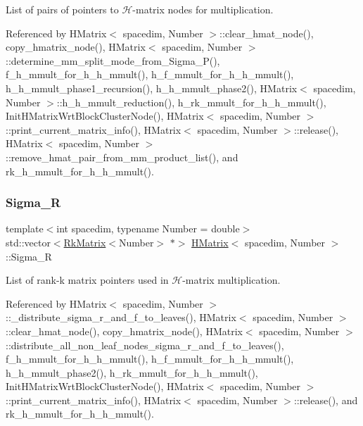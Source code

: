 List of pairs of pointers to $\mathcal{H}$-\/matrix nodes for multiplication. 

Referenced by H\+Matrix$<$ spacedim, Number $>$\+::clear\+\_\+hmat\+\_\+node(), copy\+\_\+hmatrix\+\_\+node(), H\+Matrix$<$ spacedim, Number $>$\+::determine\+\_\+mm\+\_\+split\+\_\+mode\+\_\+from\+\_\+\+Sigma\+\_\+\+P(), f\+\_\+h\+\_\+mmult\+\_\+for\+\_\+h\+\_\+h\+\_\+mmult(), h\+\_\+f\+\_\+mmult\+\_\+for\+\_\+h\+\_\+h\+\_\+mmult(), h\+\_\+h\+\_\+mmult\+\_\+phase1\+\_\+recursion(), h\+\_\+h\+\_\+mmult\+\_\+phase2(), H\+Matrix$<$ spacedim, Number $>$\+::h\+\_\+h\+\_\+mmult\+\_\+reduction(), h\+\_\+rk\+\_\+mmult\+\_\+for\+\_\+h\+\_\+h\+\_\+mmult(), Init\+H\+Matrix\+Wrt\+Block\+Cluster\+Node(), H\+Matrix$<$ spacedim, Number $>$\+::print\+\_\+current\+\_\+matrix\+\_\+info(), H\+Matrix$<$ spacedim, Number $>$\+::release(), H\+Matrix$<$ spacedim, Number $>$\+::remove\+\_\+hmat\+\_\+pair\+\_\+from\+\_\+mm\+\_\+product\+\_\+list(), and rk\+\_\+h\+\_\+mmult\+\_\+for\+\_\+h\+\_\+h\+\_\+mmult().

\mbox{\label{classHMatrix_a04d341b4e606d1be2d71b8ea636efe7b}} 
\subsubsection{\texorpdfstring{Sigma\+\_\+R}{Sigma\_R}}
{\footnotesize\ttfamily template$<$int spacedim, typename Number = double$>$ \\
std\+::vector$<$\hyperlink{classRkMatrix}{Rk\+Matrix}$<$Number$>$ $\ast$$>$ \hyperlink{classHMatrix}{H\+Matrix}$<$ spacedim, Number $>$\+::Sigma\+\_\+R\hspace{0.3cm}{\ttfamily [private]}}

List of rank-\/k matrix pointers used in $\mathcal{H}$-\/matrix multiplication. 

Referenced by H\+Matrix$<$ spacedim, Number $>$\+::\+\_\+distribute\+\_\+sigma\+\_\+r\+\_\+and\+\_\+f\+\_\+to\+\_\+leaves(), H\+Matrix$<$ spacedim, Number $>$\+::clear\+\_\+hmat\+\_\+node(), copy\+\_\+hmatrix\+\_\+node(), H\+Matrix$<$ spacedim, Number $>$\+::distribute\+\_\+all\+\_\+non\+\_\+leaf\+\_\+nodes\+\_\+sigma\+\_\+r\+\_\+and\+\_\+f\+\_\+to\+\_\+leaves(), f\+\_\+h\+\_\+mmult\+\_\+for\+\_\+h\+\_\+h\+\_\+mmult(), h\+\_\+f\+\_\+mmult\+\_\+for\+\_\+h\+\_\+h\+\_\+mmult(), h\+\_\+h\+\_\+mmult\+\_\+phase2(), h\+\_\+rk\+\_\+mmult\+\_\+for\+\_\+h\+\_\+h\+\_\+mmult(), Init\+H\+Matrix\+Wrt\+Block\+Cluster\+Node(), H\+Matrix$<$ spacedim, Number $>$\+::print\+\_\+current\+\_\+matrix\+\_\+info(), H\+Matrix$<$ spacedim, Number $>$\+::release(), and rk\+\_\+h\+\_\+mmult\+\_\+for\+\_\+h\+\_\+h\+\_\+mmult().

